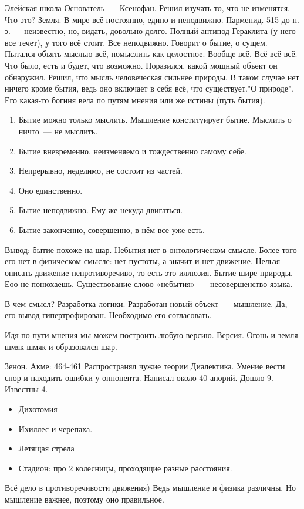 Элейская школа
Основатель~--- Ксенофан. Решил изучать то, что не изменятся. Что это? Земля. В мире всё постоянно, едино и неподвижно. 
Парменид. 515 до н. э. --- неизвестно, но, видать, довольно долго. Полный антипод Гераклита (у него все течет), у того всё стоит. Все неподвижно. Говорит о бытие, о сущем. 
Пытался объять мыслью всё, помыслить как целостное. Вообще всё. Всё-всё-всё. Что было, есть и будет, что возможно. Поразился, какой мощный объект он обнаружил. Решил, что мысль человеческая сильнее природы. 
В таком случае нет ничего кроме бытия, ведь оно включает в себя всё, что существует."О природе". Его какая-то богиня вела по путям мнения или же истины (путь бытия). 
\begin{enumerate}
	\item Бытие можно только мыслить. Мышление конституирует бытие. Мыслить о ничто~--- не мыслить. 
	\item Бытие вневременно, неизменяемо и тождественно самому себе. 
	\item Непрерывно, неделимо, не состоит из частей. 
	\item Оно единственно. 
	\item Бытие неподвижно. Ему же некуда двигаться. 
	\item Бытие законченно, совершенно, в нём все уже есть. 
\end{enumerate}

Вывод: бытие похоже на шар. 
Небытия нет в онтологическом смысле. Более того его нет в физическом смысле: нет пустоты, а значит и нет движение. Нельзя описать движение непротиворечиво, то есть это иллюзия. 
Бытие шире природы. Еоо не понюхаешь. 
Существование слово «небытия»~--- несовершенство языка. 

В чем смысл? Разработка логики. Разработан новый объект~--- мышление. Да, его вывод гипертрофирован. Необходимо его согласовать. 

Идя по пути мнения мы можем построить любую версию. 
Версия. Огонь и земля шмяк-шмяк и образовался шар. 

Зенон. Акме: 464-461 
Распространял чужие теории
Диалектика. Умение вести спор и находить ошибки у оппонента. Написал около 40 апорий. Дошло 9. Известны 4. 

\begin{itemize}
	\item Дихотомия
	\item Ихиллес и черепаха. 
	\item Летящая стрела
	\item Стадион: про 2 колесницы, проходящие разные расстояния. 
\end{itemize}

Всё дело в противоречивости движения) Ведь мышление и физика различны. Но мышление важнее, поэтому оно правильное. 
